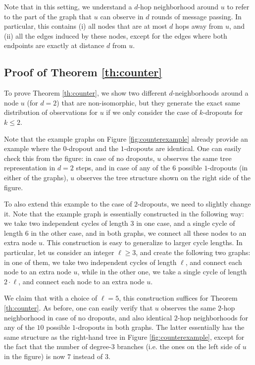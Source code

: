 \documentclass{article}
\begin{document}
Note that in this setting, we understand a $d$-hop neighborhood around $u$ to refer to the part of the graph that $u$ can observe in $d$ rounds of message passing. In particular, this contains (i) all nodes that are at most $d$ hops away from $u$, and (ii) all the edges induced by these nodes, except for the edges where both endpoints are exactly at distance $d$ from $u$.

\subsection{Proof of Theorem \ref{th:counter}}

To prove Theorem \ref{th:counter}, we show two different $d$-neighborhoods around a node $u$ (for $d=2$) that are non-isomorphic, but they generate the exact same distribution of observations for $u$ if we only consider the case of $k$-dropouts for $k \leq 2$. 

Note that the example graphs on Figure \ref{fig:counterexample} already provide an example where the $0$-dropout and the $1$-dropouts are identical. One can easily check this from the figure: in case of no dropouts, $u$ observes the same tree representation in $d=2$ steps, and in case of any of the $6$ possible $1$-dropouts (in either of the graphs), $u$ observes the tree structure shown on the right side of the figure.  

To also extend this example to the case of $2$-dropouts, we need to slightly change it. Note that the example graph is essentially constructed in the following way: we take two independent cycles of length $3$ in one case, and a single cycle of length $6$ in the other case, and in both graphs, we connect all these nodes to an extra node $u$. This construction is easy to generalize to larger cycle lengths. In particular, let us consider an integer $\ell \geq 3$, and create the following two graphs: in one of them, we take two independent cycles of length $\ell$, and connect each node to an extra node $u$, while in the other one, we take a single cycle of length $2 \cdot \ell$, and connect each node to an extra node $u$.

We claim that with a choice of $\ell = 5$, this construction suffices for Theorem \ref{th:counter}. As before, one can easily verify that $u$ observes the same $2$-hop neighborhood in case of no dropouts, and also identical $2$-hop neighborhoods for any of the $10$ possible $1$-dropouts in both graphs. The latter essentially has the same structure as the right-hand tree in Figure \ref{fig:counterexample}, except for the fact that the number of degree-$3$ branches (i.e. the ones on the left side of $u$ in the figure) is now $7$ instead of $3$.
\end{document}
